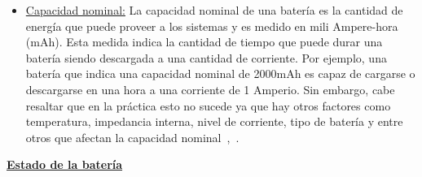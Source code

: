 \begin{itemize}
\begin{figure}[htbp]
\begin{center}
\texttt{[image: CAP1\_curvabaterianimh.jpg]}
\caption{Ciclo de vida de una batería Níquel Metal Hidruro(Ni-MH) bajo diferentes tipo de descarga~\cite{Buchmann2011}.}
\label{fig:baterianimh}
\end{center}
\end{figure}

En la figura~\ref{fig:baterianimh} se puede observar que las descargas por pulsos afectan demasiado a la capacidad eléctrica de las baterías, generalmente este tipo de descarga se encuentra en los celulares. Por otro lado, se percibe que las descargas a ratio C estandarizado por IEC y las descargas analógicas no afectan en gran magnitud a los ciclos de carga y descarga de la batería. Por último, resaltar que las pruebas de la ilustración 1 son de una batería Níquel Metal Hidruro(Ni-MH), sin embargo, el autor señala que el comportamiento es similar para las baterías Li-ion~\cite{Buchmann2011}.

\item \underline{Capacidad nominal:} La capacidad nominal de una batería es la cantidad de energía que puede proveer a los sistemas y es medido en mili Ampere-hora (mAh). Esta medida indica la cantidad de tiempo que puede durar una batería siendo descargada a una cantidad de corriente. Por ejemplo, una batería que indica una capacidad nominal de 2000mAh es capaz de cargarse o descargarse en una hora a una corriente de 1 Amperio. Sin embargo, cabe resaltar que en la práctica esto no sucede ya que hay otros factores como temperatura, impedancia interna, nivel de corriente, tipo de batería y entre otros que afectan la capacidad nominal~\cite{Buchmann2011},~\cite{MIT-2008}.

\end{itemize}

\textbf{\underline{Estado de la batería}}

